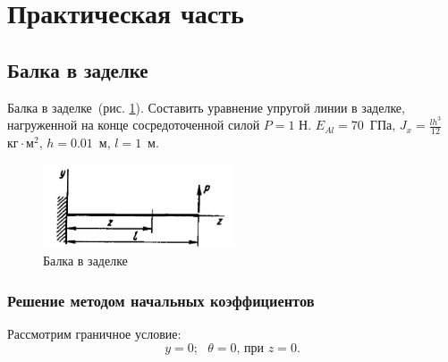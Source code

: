 \documentclass[12pt, a4paper]{article}
\begin{document}
\section{Практическая часть}
\subsection{Балка в заделке}
Балка в заделке~(рис. \ref{pic7}). Составить уравнение упругой линии в заделке, нагруженной на конце сосредоточенной силой $P = 1$ Н. 
$E_{Al} = 70$~ГПа, $ J_{x} = \frac{l h^3}{12}$~$\mbox{кг} \cdot \mbox{м}^2$, $h = 0.01$~м, $l = 1$~м.

\begin{figure}[!h]
	\centering
	\includegraphics[width=0.5\textwidth]{pic.7}%
	\caption{Балка в заделке}
	\vspace*{-2mm}
	\label{pic7}
\end{figure}

\subsubsection{Решение методом начальных коэффициентов}
Рассмотрим граничное условие:
\begin{equation}
	\label{graneq11}
	y = 0;\mbox{ } \theta = 0\mbox{, при } z = 0.
\end{equation}
\end{document}
